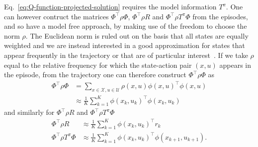 Eq.~\eqref{eq:Q-function-projected-solution} requires the model information $T^\pi$. One can however contruct the matrices $\Phi^\top\rho\Phi$, $\Phi^\top\rho R$ and $\Phi^\top\rho T^\pi\Phi$ from the episodes, and so have a model free approach, by making use of the freedom to choose the norm $\rho$. The Euclidean norm is ruled out on the basis that all states are equally weighted and we are instead interested in a good approximation for states that appear frequently in the trajectory or that are of particular interest~\cite[Sect.~11.4]{reinforcement-learning-sutton-barto}. If we take $\rho$ equal to the relative frequency for which the state-action pair $(x,u)$ appears in the episode, from the trajectory one can therefore construct $\Phi^\top\rho\Phi$ as
\begin{align*}
  \Phi^\top\rho\Phi &= \sum_{x\in\mathcal{X},u\in\mathcal{U}} \rho(x,u) \phi(x,u)^\top\phi(x,u) \\
                    &\approx \frac{1}{K} \sum_{k=1}^K \phi(x_k,u_k)^\top\phi(x_k,u_k)
\end{align*}
and similarly for $\Phi^\top\rho R$ and $\Phi^\top\rho T^\pi\Phi$
\begin{align*}
\Phi^\top\rho R &\approx \frac{1}{K} \sum_{k=1}^K \phi(x_k,u_k)^\top r_k \\
  \Phi^\top\rho T^\pi\Phi &\approx \frac{1}{K} \sum_{k=1}^K \phi(x_k,u_k)^\top\phi(x_{k+1},u_{k+1}).
\end{align*}

